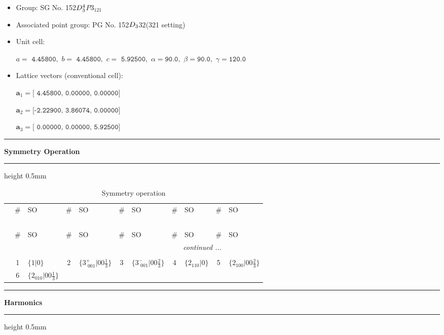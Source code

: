 \documentclass[fleqn,10pt,landscape]{jsarticle}
\begin{document}
\begin{itemize}
\item Group: SG No. 152\quad$D_{\rm 3}^{4}$\quad$P3_121$\quad[ trigonal ]
\item Associated point group: PG No. 152\quad$D_{\rm 3}$\quad$32$\quad(321 setting)\quad[ trigonal ]
\end{itemize}
\begin{itemize}
\item Unit cell:

\quad $a=\texttt{ 4.45800},\,\, b=\texttt{ 4.45800},\,\, c=\texttt{ 5.92500},\,\, \alpha=\texttt{90.0},\,\, \beta=\texttt{90.0},\,\, \gamma=\texttt{120.0}$

\item Lattice vectors (conventional cell):

\quad $\bm{a}_1=\texttt{[ 4.45800, 0.00000, 0.00000]}$

\quad $\bm{a}_2=\texttt{[-2.22900, 3.86074, 0.00000]}$

\quad $\bm{a}_3=\texttt{[ 0.00000, 0.00000, 5.92500]}$

\end{itemize}
\vspace{5mm}
\noindent \rule[0.5mm]{5mm}{0.5mm}\hspace{3mm}\textbf{Symmetry Operation}\hspace{3mm}\leaders\hrule height 0.5mm\hfill\kern0pt
\vspace{3mm}

\renewcommand{\arraystretch}{1.6}
\begin{longtable}[l]{c|cl|cl|cl|cl|cl}
\captionsetup{justification=raggedright, singlelinecheck=off}
\caption{Symmetry operation}
 \\
 \hline \hline
 & \# & SO & \# & SO & \# & SO & \# & SO & \# & SO \\ \hline \endfirsthead

\multicolumn{10}{l}{\tablename\ \thetable{}} \\
 \hline \hline
 & \# & SO & \# & SO & \# & SO & \# & SO & \# & SO \\ \hline \endhead

 \hline \hline
\multicolumn{10}{r}{\footnotesize\it continued ...} \\ \endfoot

 \hline \hline
\multicolumn{10}{r}{} \\ \endlastfoot

 & 1 & $\{1|0\}$ & 2 & $\{3^{+}_{\,\,001}|0 0 \frac{1}{3}\}$ & 3 & $\{3^{-}_{\,\,001}|0 0 \frac{2}{3}\}$ & 4 & $\{2{}_{110}|0\}$ & 5 & $\{2{}_{100}|0 0 \frac{2}{3}\}$ \\
& 6 & $\{2{}_{010}|0 0 \frac{1}{3}\}$ &  &  &  &  &  &  &  &  \\
\end{longtable}
\vspace{5mm}
\noindent \rule[0.5mm]{5mm}{0.5mm}\hspace{3mm}\textbf{Harmonics}\hspace{3mm}\leaders\hrule height 0.5mm\hfill\kern0pt
\vspace{3mm}
\end{document}

